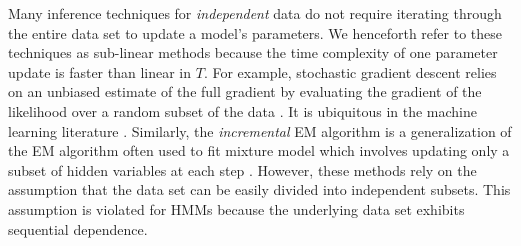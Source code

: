 Many inference techniques for \textit{independent} data do not require iterating through the entire data set to update a model's parameters. We henceforth refer to these techniques as sub-linear methods because the time complexity of one parameter update is faster than linear in $T$. 
%
For example, stochastic gradient descent relies on an unbiased estimate of the full gradient by evaluating the gradient of the likelihood over a random subset of the data \citep{Robbins:1951}. It is ubiquitous in the machine learning literature \citep{Johnson:2013, Defazio:2014, Kingma:2014}. %
%
Similarly, the \textit{incremental} EM algorithm is a generalization of the EM algorithm often used to fit mixture model which involves updating only a subset of hidden variables at each step \citep{Neal:1998, Thiesson:2001, Karimi:2019}. %
%
%
However, these methods rely on the assumption that the data set can be easily divided into independent subsets. This assumption is violated for HMMs because the underlying data set exhibits sequential dependence. 

